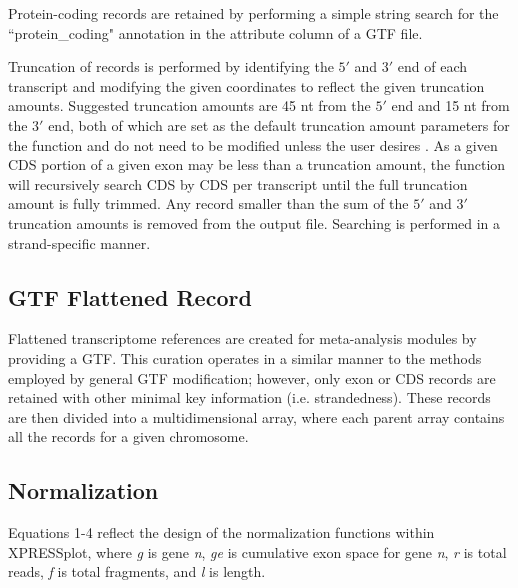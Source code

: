 \documentclass[10pt, oneside]{article}
\begin{document}
Protein-coding records are retained by performing a simple string search for the ``protein\_coding" annotation in the attribute column of a GTF file. \par

Truncation of records is performed by identifying the $5'$ and $3'$ end of each transcript and modifying the given coordinates to reflect the given truncation amounts. Suggested truncation amounts are 45 nt from the $5'$ end and 15 nt from the $3'$ end, both of which are set as the default truncation amount parameters for the function and do not need to be modified unless the user desires \cite{ingolia_meth}. As a given CDS portion of a given exon may be less than a truncation amount, the function will recursively search CDS by CDS per transcript until the full truncation amount is fully trimmed. Any record smaller than the sum of the $5'$ and $3'$ truncation amounts is removed from the output file. Searching is performed in a strand-specific manner. \par

\subsection{GTF Flattened Record}
Flattened transcriptome references are created for meta-analysis modules by providing a GTF. This curation operates in a similar manner to the methods employed by general GTF modification; however, only exon or CDS records are retained with other minimal key information (i.e. strandedness). These records are then divided into a multidimensional array, where each parent array contains all the records for a given chromosome. \par

\subsection{Normalization}
Equations 1-4 reflect the design of the normalization functions within XPRESSplot, where \textit{g} is gene \textit{n}, \textit{ge} is cumulative exon space for gene \textit{n}, \textit{r} is total reads, \textit{f} is total fragments, and \textit{l} is length.
\end{document}
